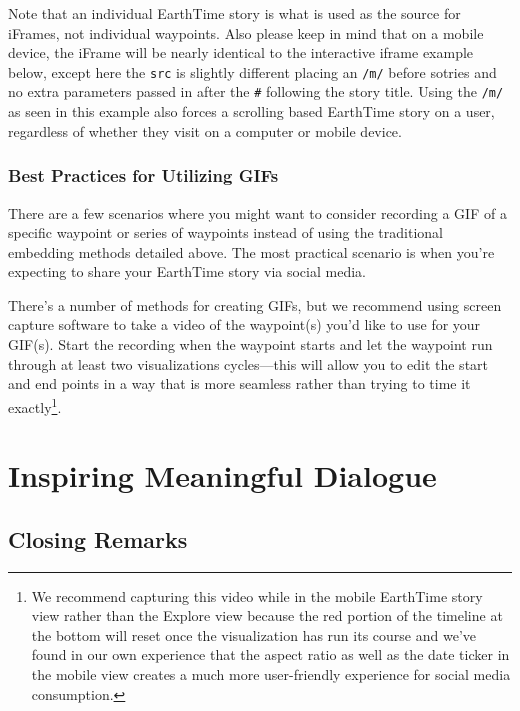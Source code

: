 \documentclass[
]{book}
\begin{document}
Note that an individual EarthTime story is what is used as the source for iFrames, not individual waypoints. Also please keep in mind that on a mobile device, the iFrame will be nearly identical to the interactive iframe example below, except here the \texttt{src} is slightly different placing an \texttt{/m/} before sotries and no extra parameters passed in after the \texttt{\#} following the story title. Using the \texttt{/m/} as seen in this example also forces a scrolling based EarthTime story on a user, regardless of whether they visit on a computer or mobile device.

\hypertarget{best-practices-for-utilizing-gifs}{%
\section{Best Practices for Utilizing GIFs}\label{best-practices-for-utilizing-gifs}}

There are a few scenarios where you might want to consider recording a GIF of a specific waypoint or series of waypoints instead of using the traditional embedding methods detailed above. The most practical scenario is when you're expecting to share your EarthTime story via social media.

There's a number of methods for creating GIFs, but we recommend using screen capture software to take a video of the waypoint(s) you'd like to use for your GIF(s). Start the recording when the waypoint starts and let the waypoint run through at least two visualizations cycles---this will allow you to edit the start and end points in a way that is more seamless rather than trying to time it exactly\footnote{We recommend capturing this video while in the mobile EarthTime story view rather than the Explore view because the red portion of the timeline at the bottom will reset once the visualization has run its course and we've found in our own experience that the aspect ratio as well as the date ticker in the mobile view creates a much more user-friendly experience for social media consumption.}.

\hypertarget{part-inspiring-meaningful-dialogue}{%
\part{Inspiring Meaningful Dialogue}\label{part-inspiring-meaningful-dialogue}}

\hypertarget{closing-remarks}{%
\chapter{Closing Remarks}\label{closing-remarks}}
\end{document}

